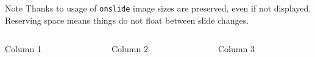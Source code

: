 {
\begin{block}{Note}
Thanks to usage of \texttt{onslide} image sizes are preserved, even if not displayed.
Reserving space means things do not float between slide changes.
\end{block}

\begin{columns}

\begin{column}{0.33\textwidth}
\begin{center}
Column 1
\end{center}
\end{column}

\begin{column}{0.33\textwidth}
\begin{center}
Column 2
\end{center}
\end{column}

\begin{column}{0.33\textwidth}
\begin{center}
Column 3
\end{center}
\end{column}

\end{columns}

\begin{columns}

\begin{column}{0.33\textwidth}
\begin{center}
\end{center}
\end{column}

\begin{column}{0.33\textwidth}
\begin{center}
\end{center}
\end{column}

\begin{column}{0.33\textwidth}
\begin{center}
\end{center}
\end{column}

\end{columns}
}
